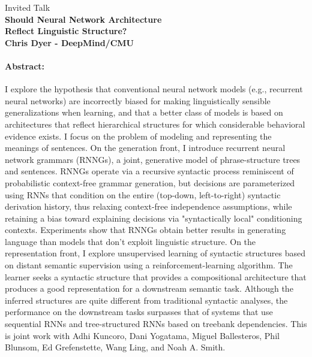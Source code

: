 \documentclass[11pt]{article}
\begin{document}
\begin{center}
{\Large Invited Talk \hfill\\}
\vspace{3mm}
  {\LARGE \bf  Should Neural Network Architecture \hfill\\}
{\LARGE \bf Reflect Linguistic Structure? \hfill\\}
\vspace{6mm}
{\Large \bf  Chris Dyer - DeepMind/CMU}\hfill\\

\end{center}

\vspace*{0.5cm}






\paragraph{Abstract:}
I explore the hypothesis that conventional neural network models (e.g., recurrent neural networks) are incorrectly biased for making linguistically sensible generalizations when learning, and that a better class of models is based on architectures that reflect hierarchical structures for which considerable behavioral evidence exists. I focus on the problem of modeling and representing the meanings of sentences. On the generation front, I introduce recurrent neural network grammars (RNNGs), a joint, generative model of phrase-structure trees and sentences. RNNGs operate via a recursive syntactic process reminiscent of probabilistic context-free grammar generation, but decisions are parameterized using RNNs that condition on the entire (top-down, left-to-right) syntactic derivation history, thus relaxing context-free independence assumptions, while retaining a bias toward explaining decisions via "syntactically local" conditioning contexts. Experiments show that RNNGs obtain better results in generating language than models that don’t exploit linguistic structure. On the representation front, I explore unsupervised learning of syntactic structures based on distant semantic supervision using a reinforcement-learning algorithm. The learner seeks a syntactic structure that provides a compositional architecture that produces a good representation for a downstream semantic task. Although the inferred structures are quite different from traditional syntactic analyses, the performance on the downstream tasks surpasses that of systems that use sequential RNNs and tree-structured RNNs based on treebank dependencies. This is joint work with Adhi Kuncoro, Dani Yogatama, Miguel Ballesteros, Phil Blunsom, Ed Grefenstette, Wang Ling, and Noah A. Smith.
\end{document}
